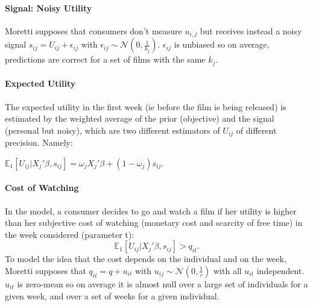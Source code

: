 \documentclass{article}
\begin{document}
\paragraph{Signal: Noisy Utility}
Moretti supposes that consumers don't measure $u_{i,j}$ but receives instead a noisy signal $s_{i j}=U_{i j}+\epsilon_{i j}$ with $\epsilon_{i j}\sim \mathcal{N}(0,\frac{1}{k_{j}})$. $\epsilon_{i j}$ is unbiased so on average, predictions are correct for a set of films with the same $k_{j}$.

\paragraph{Expected Utility}
The expected utility in the first week (ie before the film is being released) is estimated by the weighted average of the prior (objective) and the signal (personal but noisy), which are two different estimators of $U_{i j}$ of different precision. Namely:
\begin{center}
	$\mathbb{E}_1[U_{i j}|X_{j}'\beta, s_{i j}]=\omega_{j} X_{j}'\beta+(1-\omega_{j})s_{i j}$.
\end{center}
\paragraph{Cost of Watching}
In the model, a consumer decides to go and watch a film if her utility is higher than her subjective cost of watching (monetary cost and scarcity of free time) in the week considered (parameter t): 
\begin{equation}
\mathbb{E}_1[U_{i j}|X_{j}'\beta, s_{i j}]>q_{i t}.
\end{equation}
To model the idea that the cost depends on the individual and on the week, Moretti supposes that $q_{i t}=q+u_{i t}$ with $u_{i j}\sim \mathcal{N}(0,\frac{1}{r})$ with all $u_{i t}$ independent. $u_{i t}$ is zero-mean so on average it is almost null over a large set of individuals for a given week, and over a set of weeks for a given individual.
\end{document}
